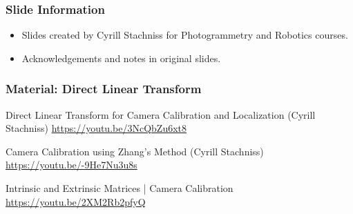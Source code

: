 \begin{frame}
  \frametitle{Slide Information}
  \begin{itemize}
    \item Slides created by Cyrill Stachniss for Photogrammetry and Robotics courses.
    \item Acknowledgements and notes in original slides.
  \end{itemize}
\end{frame}

\begin{frame}
  \frametitle{Material: Direct Linear Transform}

  Direct Linear Transform for Camera Calibration and Localization (Cyrill Stachniss)
  \url{https://youtu.be/3NcQbZu6xt8}

  Camera Calibration using Zhang's Method (Cyrill Stachniss)
  \url{https://youtu.be/-9He7Nu3u8s}

  Intrinsic and Extrinsic Matrices | Camera Calibration
  \url{https://youtu.be/2XM2Rb2pfyQ}

\end{frame}
